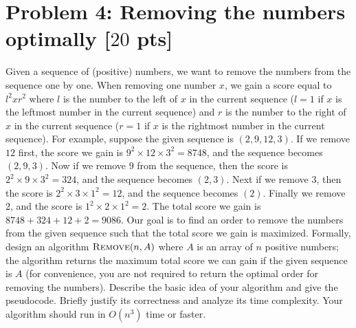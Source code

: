 \documentclass[11pt,twoside]{article}
\newcommand{\problem}[1]{\section*{Problem #1}}
\begin{document}
\problem{4: Removing the numbers optimally [$20$ pts]}
Given a sequence of (positive) numbers, we want to remove the numbers from the sequence one by one.
When removing one number $x$, we gain a score equal to $l^2 x r^2$ where $l$ is the number to the left of $x$ in the current sequence ($l = 1$ if $x$ is the leftmost number in the current sequence) and $r$ is the number to the right of $x$ in the current sequence ($r = 1$ if $x$ is the rightmost number in the current sequence).
For example, suppose the given sequence is $(2,9,12,3)$.
If we remove $12$ first, the score we gain is $9^2 \times 12 \times 3^2 = 8748$, and the sequence becomes $(2,9,3)$.
Now if we remove $9$ from the sequence, then the score is $2^2 \times 9 \times 3^2 = 324$, and the sequence becomes $(2,3)$.
Next if we remove $3$, then the score is $2^2 \times 3 \times 1^2 = 12$, and the sequence becomes $(2)$.
Finally we remove $2$, and  the score is $1^2 \times 2 \times 1^2 = 2$.
The total score we gain is $8748+324+12+2 = 9086$.
Our goal is to find an order to remove the numbers from the given sequence such that the total score we gain is maximized.
Formally, design an algorithm $\textsc{Remove}(n,A)$ where $A$ is an array of $n$ positive numbers; the algorithm returns the maximum total score we can gain if the given sequence is $A$ (for convenience, you are not required to return the optimal order for removing the numbers).
Describe the basic idea of your algorithm and give the pseudocode.
Briefly justify its correctness and analyze its time complexity.
Your algorithm should run in $O(n^3)$ time or faster.
\end{document}
